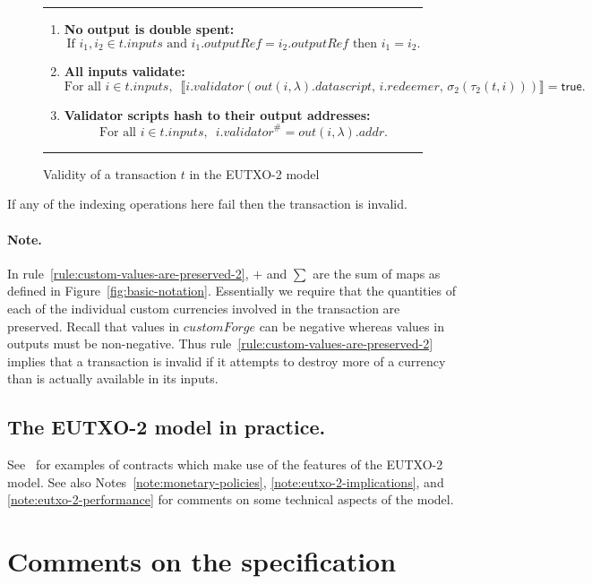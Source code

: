 \documentclass[a4paper]{article}
\newcounter{note}
\newcommand\rfskip{7pt}
\newenvironment{ruledfigure}[1]{\begin{figure}[#1]\hrule\vspace{\rfskip}}{\vspace{\rfskip}\hrule\end{figure}}
\newcommand{\true}{\textsf{true}}
\newcommand{\mi}[1]{\ensuremath{\mathit{#1}}}
\newcommand{\inputs}{\mi{inputs}}
\newcommand{\addr}{\mi{addr}}
\newcommand{\customforge}{\mi{customForge}}
\newcommand{\validator}{\mi{validator}}
\newcommand{\redeemer}{\mi{redeemer}}
\newcommand{\datascript}{\mi{datascript}}
\newcommand{\txout}{\mi{out}}
\begin{document}
\begin{ruledfigure}{H}
\begin{enumerate}
\begin{minipage}{0.85\textwidth}
          \end{minipage}
    \item \label{rule:no-double-spending-2} \textbf{No output is double spent:}
    \[
     \textrm{If } i_1, i_2 \in t.\inputs \textrm{ and }  i_1.\mathit{outputRef} = i_2.\mathit{outputRef}
     \textrm{ then } i_1 = i_2.
    \]
    \item\label{rule:all-inputs-validate-2} \textbf{All inputs validate:}
    \[
    \textrm{For all } i \in t.\inputs,\enspace \llbracket
    i.\validator(\txout(i,\lambda).\datascript,\, i.\redeemer,\, \sigma_2(\tau_2(t, i)))
    \rrbracket = \true.
      \]
    \item\label{rule:validator-scripts-hash-2} \textbf{Validator scripts hash to their output addresses:}
    \[
      \textrm{For all } i \in t.\inputs,\enspace i.\validator^{\#} = \txout(i, \lambda).\addr.
    \]
  \end{enumerate}
  \caption{Validity of a transaction $t$ in the EUTXO-2 model}
  \label{fig:eutxo-2-validity}

\end{ruledfigure}

\noindent If any of the indexing operations here fail then the
transaction is invalid.

\paragraph{Note.} In rule~\ref{rule:custom-values-are-preserved-2},
$+$ and $\sum$ are the sum of maps as defined in
Figure~\ref{fig:basic-notation}. Essentially we require that the
quantities of each of the individual custom currencies involved in the
transaction are preserved.  Recall that values in $\customforge$ can
be negative whereas values in outputs must be non-negative.  Thus
rule~\ref{rule:custom-values-are-preserved-2} implies that a
transaction is invalid if it attempts to destroy more of a currency
than is actually available in its inputs.

\subsection{The EUTXO-2 model in practice.}
See~\cite{Plutus-book} for examples of contracts which make use of the
features of the EUTXO-2 model.  See also
Notes~\ref{note:monetary-policies}, \ref{note:eutxo-2-implications},
and \ref{note:eutxo-2-performance} for comments on some technical
aspects of the model.

\appendix
\section{Comments on the specification}
\label{appendix:comments}
\end{document}
